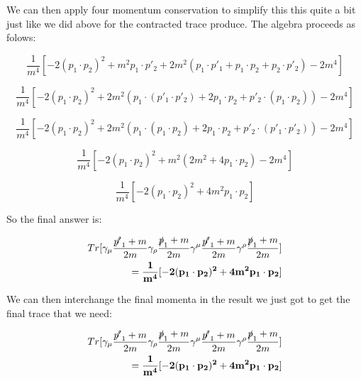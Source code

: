 \documentclass[a4]{article}
\begin{document}
    We can then apply four momentum conservation to simplify this this quite a bit just like we did above for the contracted trace produce. The algebra proceeds as folows:

    \begin{equation}
        \frac{1}{m^4} [-2 (p_1 \cdot p_2)^2 + m^2 p_1 \cdot p'_2 + 2 m^2 (p_1 \cdot p'_1 + p_1 \cdot p_2 + p_2 \cdot p'_2) - 2 m^4]
    \end{equation}

    \begin{equation}
        \frac{1}{m^4} [-2 (p_1 \cdot p_2)^2 + 2 m^2 (p_1 \cdot (p'_1 \cdot p'_2) + 2 p_1 \cdot p_2 + p'_2 \cdot (p_1 \cdot p_2)) - 2 m^4]
    \end{equation}

    \begin{equation}
        \frac{1}{m^4} [-2 (p_1 \cdot p_2)^2 + 2 m^2 (p_1 \cdot (p_1 \cdot p_2) + 2 p_1 \cdot p_2 + p'_2 \cdot (p'_1 \cdot p'_2)) - 2 m^4]
    \end{equation}

    \begin{equation}
        \frac{1}{m^4} [-2 (p_1 \cdot p_2)^2 + m^2 (2 m^2 + 4 p_1 \cdot p_2) - 2 m^4]
    \end{equation}

    \begin{equation}
        \frac{1}{m^4} [-2 (p_1 \cdot p_2)^2 + 4 m^2 p_1 \cdot p_2]
    \end{equation}

    So the final answer is:

    \begin{framed}
        \begin{eqnarray}
            Tr [\gamma_\mu \frac{\slashed{p'}_1 + m}{2m} \gamma_\rho \frac{\slashed{p}_1 + m}{2 m} \gamma^\mu \frac{\slashed{p'}_1 + m}{2m} \gamma^\rho \frac{\slashed{p}_1 + m}{2 m}] \\
            = \mathbf{\frac{1}{m^4} [-2 (p_1 \cdot p_2)^2 + 4 m^2 p_1 \cdot p_2]}
        \end{eqnarray}
    \end{framed}

    We can then interchange the final momenta in the result we just got to get the final trace that we need:

    \begin{framed}
        \begin{eqnarray}
            Tr [\gamma_\mu \frac{\slashed{p'}_1 + m}{2m} \gamma_\rho \frac{\slashed{p}_1 + m}{2 m} \gamma^\mu \frac{\slashed{p'}_1 + m}{2m} \gamma^\rho \frac{\slashed{p}_1 + m}{2 m}] \\
            = \mathbf{\frac{1}{m^4} [-2 (p_1 \cdot p_2)^2 + 4 m^2 p_1 \cdot p_2]}
        \end{eqnarray}
    \end{framed}
\end{document}
